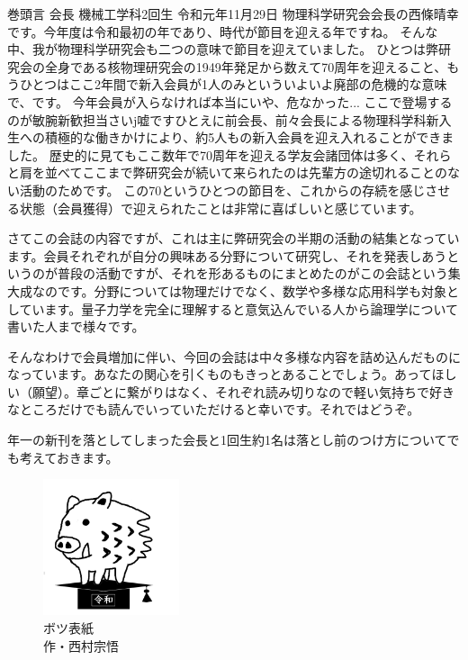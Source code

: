 \documentclass[10pt,b5paper,papersize,dvipdfmx]{jsbook}
\begin{document}
\begin{preface}{巻頭言}
        {会長}%
        {機械工学科2回生}%
        {}%
        {令和元年11月29日}%
  物理科学研究会会長の西條晴幸です。今年度は令和最初の年であり、時代が節目を迎える年ですね。
  そんな中、我が物理科学研究会も二つの意味で節目を迎えていました。
  ひとつは弊研究会の全身である核物理研究会の1949年発足から数えて70周年を迎えること、もうひとつはここ2年間で新入会員が1人のみといういよいよ廃部の危機的な意味で、です。
  今年会員が入らなければ本当にいや、危なかった...
  ここで登場するのが敏腕新歓担当さいj嘘ですひとえに前会長、前々会長による物理科学科新入生への積極的な働きかけにより、約5人もの新入会員を迎え入れることができました。
  歴史的に見てもここ数年で70周年を迎える学友会諸団体は多く、それらと肩を並べてここまで弊研究会が続いて来られたのは先輩方の途切れることのない活動のためです。
  この70というひとつの節目を、これからの存続を感じさせる状態（会員獲得）で迎えられたことは非常に喜ばしいと感じています。\par
  さてこの会誌の内容ですが、これは主に弊研究会の半期の活動の結集となっています。会員それぞれが自分の興味ある分野について研究し、それを発表しあうというのが普段の活動ですが、それを形あるものにまとめたのがこの会誌という集大成なのです。分野については物理だけでなく、数学や多様な応用科学も対象としています。量子力学を完全に理解すると意気込んでいる人から論理学について書いた人まで様々です。\par
  そんなわけで会員増加に伴い、今回の会誌は中々多様な内容を詰め込んだものになっています。あなたの関心を引くものもきっとあることでしょう。あってほしい（願望）。章ごとに繋がりはなく、それぞれ読み切りなので軽い気持ちで好きなところだけでも読んでいっていただけると幸いです。それではどうぞ。\par
  年一の新刊を落としてしまった会長と1回生約1名は落とし前のつけ方についてでも考えておきます。
\end{preface}


\clearpage
\quad\vfill
\begin{figure}[htb]
  \centering
  \includegraphics[width=40mm]{img/inoshishi.png}
  \caption*{
    \setlength{\baselineskip}{1.2zw}\gtfamily
    ボツ表紙 \\ 作・西村宗悟
  }
  \label{}
\end{figure}
\vfill
\end{document}
